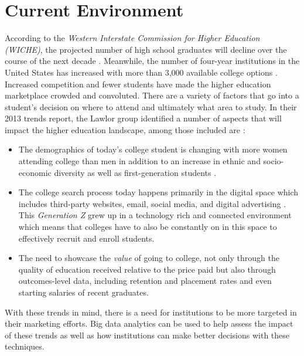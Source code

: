 \documentclass[sigconf]{acmart}
\begin{document}
\section{Current Environment}

According to the \textit{Western Interstate Commission for Higher Education (WICHE)}, the projected number of high school graduates will decline over the course of the next decade \cite{Bransberger2017}. Meanwhile, the number of four-year institutions in the United States has increased with more than 3,000 available college options \cite{EducationStatistics2015}. Increased competition and fewer students have made the higher education marketplace crowded and convoluted. There are a variety of factors that go into a student's decision on where to attend and ultimately what area to study. In their 2013 trends report, the Lawlor group  identified a number of aspects that will impact the higher education landscape, among those included are \cite{Research2014}:

\begin{itemize}
\item The demographics of today's college student is changing with more women attending college than men in addition to an increase in ethnic and socio-economic diversity as well as first-generation students \cite{Bransberger2017}.
\vspace{5mm}
\item The college search process today happens primarily in the digital space which includes third-party websites, email, social media, and digital advertising \cite{Geyer2016}. This \textit{Generation Z} grew up in a technology rich and connected environment which means that colleges have to also be constantly on in this space to effectively recruit and enroll students.
\vspace{5mm}
\item The need to showcase the \textit{value} of going to college, not only through the quality of education received relative to the price paid but also through outcomes-level data, including retention and placement rates and even starting salaries of recent graduates. 
\end{itemize}
With these trends in mind, there is a need for institutions to be more targeted in their marketing efforts. Big data analytics can be used to help assess the impact of these trends as well as how institutions can make better decisions with these techniques.
\end{document}
